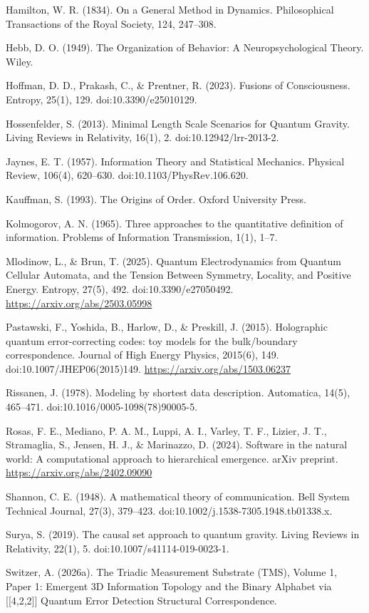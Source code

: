 \documentclass[11pt,oneside]{report}
\theoremstyle{definition}
\theoremstyle{remark}
\newenvironment{reflist}
  {\par\small\setlength{\parindent}{0pt}%
   \setlength{\leftskip}{1.6em}\setlength{\parindent}{-1.6em}%
   \setlength{\parskip}{0.4em}%
   \raggedright\hyphenpenalty=50\exhyphenpenalty=50\relax
   \sloppy}
  {\par}
\begin{document}
\begin{reflist}
Hamilton, W. R. (1834). On a General Method in Dynamics. Philosophical
Transactions of the Royal Society, 124, 247--308.

Hebb, D. O. (1949). The Organization of Behavior: A Neuropsychological
Theory. Wiley.

Hoffman, D. D., Prakash, C., \& Prentner, R. (2023). Fusions of
Consciousness. Entropy, 25(1), 129. doi:10.3390/e25010129.

Hossenfelder, S. (2013). Minimal Length Scale Scenarios for Quantum
Gravity. Living Reviews in Relativity, 16(1), 2.
doi:10.12942/lrr-2013-2.

Jaynes, E. T. (1957). Information Theory and Statistical Mechanics.
Physical Review, 106(4), 620--630. doi:10.1103/PhysRev.106.620.

Kauffman, S. (1993). The Origins of Order. Oxford University Press.

Kolmogorov, A. N. (1965). Three approaches to the quantitative
definition of information. Problems of Information Transmission, 1(1),
1--7.

Mlodinow, L., \& Brun, T. (2025). Quantum Electrodynamics from Quantum
Cellular Automata, and the Tension Between Symmetry, Locality, and
Positive Energy. Entropy, 27(5), 492. doi:10.3390/e27050492.
\url{https://arxiv.org/abs/2503.05998}

Pastawski, F., Yoshida, B., Harlow, D., \& Preskill, J. (2015).
Holographic quantum error-correcting codes: toy models for the
bulk/boundary correspondence. Journal of High Energy Physics, 2015(6),
149. doi:10.1007/JHEP06(2015)149. \url{https://arxiv.org/abs/1503.06237}

Rissanen, J. (1978). Modeling by shortest data description. Automatica,
14(5), 465--471. doi:10.1016/0005-1098(78)90005-5.

Rosas, F. E., Mediano, P. A. M., Luppi, A. I., Varley, T. F., Lizier, J.
T., Stramaglia, S., Jensen, H. J., \& Marinazzo, D. (2024). Software in
the natural world: A computational approach to hierarchical emergence.
arXiv preprint. \url{https://arxiv.org/abs/2402.09090}

Shannon, C. E. (1948). A mathematical theory of communication. Bell
System Technical Journal, 27(3), 379--423.
doi:10.1002/j.1538-7305.1948.tb01338.x.

Surya, S. (2019). The causal set approach to quantum gravity. Living
Reviews in Relativity, 22(1), 5. doi:10.1007/s41114-019-0023-1.

Switzer, A. (2026a). The Triadic Measurement Substrate (TMS), Volume 1,
Paper 1: Emergent 3D Information Topology and the Binary Alphabet via
[[4,2,2]] Quantum Error Detection Structural Correspondence.


\end{reflist}
\end{document}
